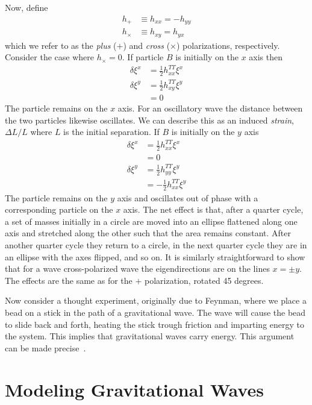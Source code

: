 Now, define
%
\begin{align*}
h_+ &\equiv h_{xx} = - h_{yy} \\
h_\times &\equiv h_{xy} = h_{yx}
\end{align*}
%
which we refer to as the \emph{plus} ($+$) and \emph{cross} ($\times$)
polarizations, respectively.  Consider the case where $h_\times = 0$.
If particle $B$ is initially on the $x$ axis then 
%
\begin{align*}
\delta \xi^x &= \frac{1}{2} h^{TT}_{xx} \xi^x \\
\delta \xi^y &= \frac{1}{2} h^{TT}_{xy} \xi^y \\
&= 0
\end{align*}
%
The particle remains on the $x$ axis.  For an oscillatory wave the
distance between the two particles likewise oscillates.  We can
describe this as an induced \emph{strain}, $\Delta L/L$ where $L$ is
the initial separation.  If $B$ is initially on the $y$ axis
%
\begin{align*}
\delta \xi^x &= \frac{1}{2} h^{TT}_{xx} \xi^x \\
&= 0 \\
\delta \xi^y &= \frac{1}{2} h^{TT}_{yy} \xi^y \\
&= - \frac{1}{2} h^{TT}_{xx} \xi^y
\end{align*}
%
The particle remains on the $y$ axis and oscillates out of phase with
a corresponding particle on the $x$ axis.  The net effect is that,
after a quarter cycle, a set of masses initially in a circle are moved
into an ellipse flattened along one axis and stretched along the other
such that the area remains constant.  After another quarter cycle they
return to a circle, in the next quarter cycle they are in an ellipse
with the axes flipped, and so on. It is similarly straightforward to
show that for a wave cross-polarized wave the eigendirections are on
the lines $x=\pm y$.  The effects are the same as for the $+$
polarization, rotated 45 degrees.

Now consider a thought experiment, originally due to Feynman, where we
place a bead on a stick in the path of a gravitational wave.  The wave
will cause the bead to slide back and forth, heating the stick trough
friction and imparting energy to the system.  This implies that
gravitational waves carry energy.  This argument can be made
precise~\cite{RevModPhys.29.509}.

\section{Modeling Gravitational Waves}

